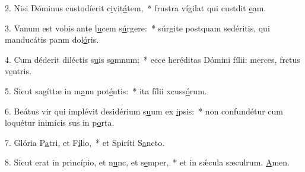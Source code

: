 2. Nisi Dóminus custodíerit c\uline{i}vit\uline{á}tem,~* frustra vígilat qui custdit \uline{e}am.\par 
3. Vanum est vobis ante l\uline{u}cem s\uline{ú}rgere:~* súrgite postquam sedéritis, qui manducátis panm dol\uline{ó}ris.\par 
4. Cum déderit diléctis s\uline{u}is s\uline{o}mnum:~* ecce heréditas Dómini fílii: merces, frctus v\uline{e}ntris.\par 
5. Sicut sagíttæ in m\uline{a}nu pot\uline{é}ntis:~* ita fílii xcuss\uline{ó}rum.\par 
6. Beátus vir qui implévit desidérium s\uline{u}um ex \uline{i}psis:~* non confundétur cum loquétur inimícis sus in p\uline{o}rta.\par 
7. Glória P\uline{a}tri, et F\uline{í}lio,~* et Spiríti S\uline{a}ncto.\par 
8. Sicut erat in princípio, et n\uline{u}nc, et s\uline{e}mper,~* et in sǽcula sæculrum. \uline{A}men.\par 
